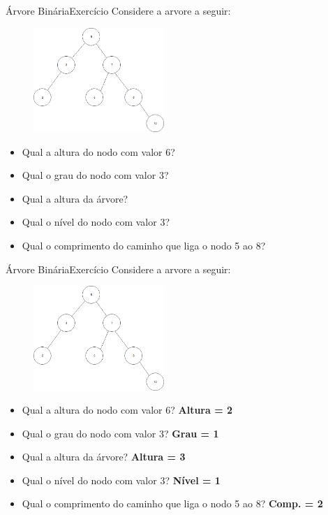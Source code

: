 \documentclass[aspectratio=169]{beamer}
\begin{document}
\begin{frame}{Árvore Binária}{Exercício}
Considere a arvore a seguir:
\begin{figure}[!h]
  \centering
  \includegraphics[width=140pt]{imagens/exercicio.png}
  \label{fig_exercicio_conceitos}
\end{figure}
\begin{itemize}
 \item Qual a altura do nodo com valor 6?
 \item Qual o grau do nodo com valor 3?
 \item Qual a altura da árvore?
 \item Qual o nível do nodo com valor 3?
 \item Qual o comprimento do caminho que liga o nodo 5 ao 8?
\end{itemize}
\end{frame}


\begin{frame}{Árvore Binária}{Exercício}
Considere a arvore a seguir:
\begin{figure}[!h]
  \centering
  \includegraphics[width=140pt]{imagens/exercicio.png}
\end{figure}
\begin{itemize}
 \item Qual a altura do nodo com valor 6? {\bf Altura = 2}
 \item Qual o grau do nodo com valor 3? {\bf Grau = 1}
 \item Qual a altura da árvore? {\bf Altura = 3}
 \item Qual o nível do nodo com valor 3? {\bf Nível = 1}
 \item Qual o comprimento do caminho que liga o nodo 5 ao 8? {\bf Comp. = 2}
\end{itemize}
\end{frame}
\end{document}
